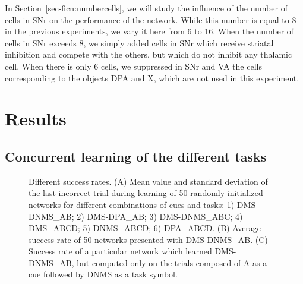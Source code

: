 \documentclass[
  11pt,
  a4paper,
]{scrbook}
\begin{document}
In Section~\ref{sec-ficn:numbercells}, we will study the influence of
the number of cells in SNr on the performance of the network. While this
number is equal to 8 in the previous experiments, we vary it here from 6
to 16. When the number of cells in SNr exceeds 8, we simply added cells
in SNr which receive striatal inhibition and compete with the others,
but which do not inhibit any thalamic cell. When there is only 6 cells,
we suppressed in SNr and VA the cells corresponding to the objects DPA
and X, which are not used in this experiment.

\section{Results}\label{results-1}

\subsection{Concurrent learning of the different
tasks}\label{sec-ficn:concurrentlearning}

\begin{figure}


\caption{\label{fig-ficn:tasks-result}Different success rates. (A) Mean
value and standard deviation of the last incorrect trial during learning
of 50 randomly initialized networks for different combinations of cues
and tasks: 1) DMS-DNMS\_AB; 2) DMS-DPA\_AB; 3) DMS-DNMS\_ABC; 4)
DMS\_ABCD; 5) DNMS\_ABCD; 6) DPA\_ABCD. (B) Average success rate of 50
networks presented with DMS-DNMS\_AB. (C) Success rate of a particular
network which learned DMS-DNMS\_AB, but computed only on the trials
composed of A as a cue followed by DNMS as a task symbol.}

\end{figure}%
\end{document}
